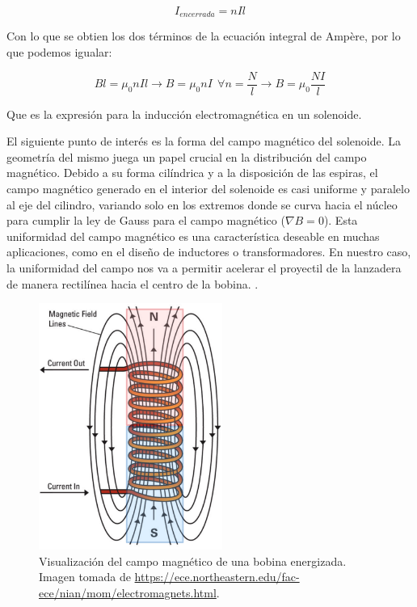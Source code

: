 \begin{center}
    \[I_{encerrada} = nIl\]
\end{center}

Con lo que se obtien los dos términos de la ecuación integral de Ampère, por lo que podemos igualar:

\begin{center}
    \[Bl=\mu_0nIl\to B=\mu_0nI~~\forall n=\frac{N}{l}\to B=\mu_0\frac{NI}{l}\]
\end{center}

Que es la expresión para la inducción electromagnética en un solenoide.

El siguiente punto de interés es la forma del campo magnético del solenoide. La geometría del mismo juega un papel crucial en la distribución del campo magnético. Debido a su forma cilíndrica y a la disposición de las espiras, el campo magnético generado en el interior del solenoide es casi uniforme y paralelo al eje del cilindro, variando solo en los extremos donde se curva hacia el núcleo para cumplir la ley de Gauss para el campo magnético (\(\nabla B=0\)). Esta uniformidad del campo magnético es una característica deseable en muchas aplicaciones, como en el diseño de inductores o transformadores. En nuestro caso, la uniformidad del campo nos va a permitir acelerar el proyectil de la lanzadera de manera rectilínea hacia el centro de la bobina.\citep{purcell2013electricidad} \citep{griffiths2005}\citep{tipler2008}.

\begin{figure}[H]
    \centering %
    \includegraphics[width=6cm]{FigurasMemoria/electromagnet.png}
    \caption{Visualización del campo magnético de una bobina energizada. Imagen tomada de \href{URL}{https://ece.northeastern.edu/fac-ece/nian/mom/electromagnets.html}.}
    \label{fig:electromagnet} %
\end{figure}

